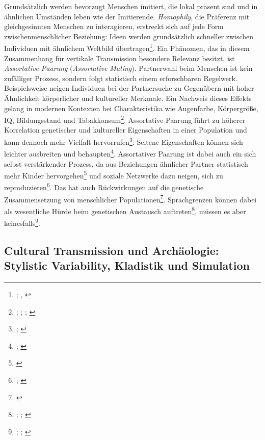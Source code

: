 \documentclass[openany,twoside,twocolumn]{book}
\let\rmarkdownfootnote\footnote%
\def\footnote{\protect\rmarkdownfootnote}
\begin{document}
Grundsätzlich werden bevorzugt Menschen imitiert, die lokal präsent sind
und in ähnlichen Umständen leben wie der Imitierende. \emph{Homophily},
die Präferenz mit gleichgesinnten Menschen zu interagieren, erstreckt
sich auf jede Form zwischenmenschlicher Beziehung: Ideen werden
grundsätzlich schneller zwischen Individuen mit ähnlichem Weltbild
übertragen\footnote{\textcite{centola_experimental_2011};
  \textcite{centola_spread_2010}, \textcite{schlag_why_1998}}. Ein
Phänomen, das in diesem Zusammenhang für vertikale Transmission
besondere Relevanz besitzt, ist \emph{Assortative Paarung}
(\emph{Assortative Mating}). Partnerwahl beim Menschen ist kein
zufälliger Prozess, sondern folgt statistisch einem erforschbaren
Regelwerk. Beispielsweise neigen Individuen bei der Partnersuche zu
Gegenübern mit hoher Ähnlichkeit körperlicher und kultureller Merkmale.
Ein Nachweis dieses Effekts gelang in modernen Kontexten bei
Charakteristika wie Augenfarbe, Körpergröße, IQ, Bildungsstand und
Tabakkonsum\footnote{\textcite{domingue_genetic_2014};
  \textcite{keller_genetic_2013}; \textcite{laeng_why_2007};
  \textcite{treur_spousal_2015}}. Assortative Paarung führt zu höherer
Korrelation genetischer und kultureller Eigenschaften in einer
Population und kann dennoch mehr Vielfalt hervorrufen\footnote{\textcite{feldman_evolution_1977};
  \textcite{rice_multifactorial_1978}}: Seltene Eigenschaften können
sich leichter ausbreiten und behaupten\footnote{\textcite{creanza_complexity_2014};
  \textcite{creanza_models_2012}}. Assortativer Paarung ist dabei auch
ein sich selbst verstärkender Prozess, da aus Beziehungen ähnlicher
Partner statistisch mehr Kinder hervorgehen\footnote{\textcite{thiessen_human_1980}}
und soziale Netzwerke dazu neigen, sich zu reproduzieren\footnote{\textcite{abdellaoui_association_2013};
  \textcite{abdellaoui_educational_2015}}. Das hat auch Rückwirkungen
auf die genetische Zusammensetzung von menschlicher
Populationen\footnote{\textcite{robinson_genetic_2017}}. Sprachgrenzen
können dabei als wesentliche Hürde beim genetischen Austausch
auftreten\footnote{\textcite{barbujani_zones_1990};
  \textcite{de_filippo_y-chromosomal_2011};
  \textcite{karafet_coevolution_2016}}, müssen es aber
keinesfalls\footnote{\textcite{hunley_gene_2005};
  \textcite{hunley_genetic_2008}; \textcite{srithawong_genetic_2015}}.

\hypertarget{stylistic-variability}{%
\subsection{Cultural Transmission und Archäologie: Stylistic
Variability, Kladistik und Simulation}\label{stylistic-variability}}
\end{document}
